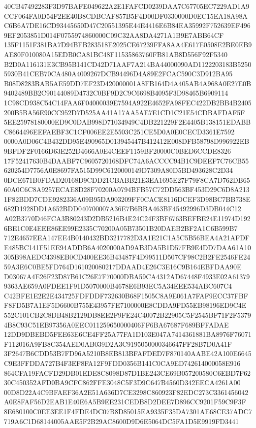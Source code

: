 \documentclass[UTF8,fontset=fandol,zihao=-4,a4paper]{ctexart}
\begin{document}
{{40CB47492283F3D97BAFE049622A2E1FAFCD0239DAA7C67705EC7229AD1A9CCF064FA0D54F2EE40B8CDBCAF857B5F4D00DF0330000D0EC15EA18A98A
C6B6A7DE16CD93445650D47C20551395E44E4416E6B84EA35992F752639EF4969EF2053851D014F0755974860000C09C32AA8DA4271A1B9E7ABB64CF
135F1151F381BA7D94BFB283518E2025CE67239FFA8AA4E617E0508E2BE0EB9AE80F010080A15EDB0CA81BC48F11535863760FB81AB8D556F92F5340
B2D0A116131E3CB95B141CD42D71AAF7A214BA44000090AD1122203183B52505930B41CEB70CA480A4009267DCB94496D4A89E2FCAC590C3D912BA95
B08D8283BAB5AE59DD7EF23D420000001A8FB164D4A405AB4A968A0E27E0B9402489BB2C90144089D4732C0BF9D2C9C6698B4095F3D98465B6909114
1C98CD938C54C14FAA6F04000039E7594A922E4652FA98FEC422DB2BB4B2405200B5BA56E90CC952D7D525AA41A17AA5AE7E1CD1C21E54CDBAFDAF5F
5EE25978180000ED9C0DAB998D71034949C4DB221229F2E4405B138151EDABBC8664496EEFAEBF3C1CF006EE2E5503C251CE5D0A0E0CECD3361E7592
0000A0D06C4B432DD95E490965D013945447B412412E008DFB58798D996922EB9BFDF2F0166D63E252D4666A0E4CEEF1159BF20000C0BED6CCDE8326
17F52417630B4DAABF7C9605720168DFC74A6ACCCC94B1C9DEEF7C76CB55620254D7756A0E8697FA515D99C6120000149D7309A80D5BD493628C2D34
0DCE671B0FDAD20168D9CDD21CBABB21E3EA1695E27F79F8CA7D762DB6560A0C6C8A9257ECAE8D28F70200A0794BFB57C72DD563BF453D29C6D8A213
1F82BDD7CDE9282336A09B95DA903209FF0CACE8116DCEF3D98BC7BB738E682D1928DD1A652BDD040700007A36E7B6BBA463BF45492996D3DB044C12
A02B3770D46FCA3B80243D2DB5216B4E24C24F3BF6763BEFBE24E11974D1926BE1C0E4EEE86EE99E2335C70200A05B73501B20DAEB2BF2A1C6B599B7
712E4657EEA147EE4B0140432BD3217782D3A1E21C1A5C5B56BEA4A21AFDFE485BC141F51EE94ADDB6A4020000AD9AB3DA5B1D57FB9E4DD7DAA61A10
305B98AEDC4398EB0CD400EE36B43487F4D99511D507CF98C2B2FE2546FE2459A3E6C0BE5FD764D161020080217DDAAD4E26C3E16C9B164EBFDAA90E
D03067A4E26F23D87B61C26E7F70000DBA59CA4312AD67448F4933E02A613799363AE659A0FDEE1F91D5070000B4678E6B93EC5A34EEE534ABC607C4
C42BFE1E2E2E434725FDFDDF732630B68F1505C8A9E061A7FAF9ECC37FBFF8FD5B7A1EF5D6600B755E43957FE7100000E8CDDA9FD55EB98196ED9C4E
552C101CB2C8DB48B2129DB8EE2F9FE24C40072B22905C5F2545BF71F2F53794B8C93C51EB97356A0EEC011259650000406FF6BA67687F689BFFADAE
12DD9DBEBD5FEE63E6CE4FF25A77FA1D103E047A7414361881BA8976F76071F112016A9FB8C354AED0AB039D2A3C9195050000346647FF28B7D0A41F
3F2647B6CDD53B7FD96A5210B8EB813BFAFDED7F870140AABE42A100E6645C9E3FFDDA727B4F3EF8FA12F9FDD0356B141C0CA9ED742614000058E916
864CFA19FACFD29DB01EDE8C8098D87D1BE243CE69B057200580C6EBD7F6230C450352AFD0BA9CFC862FFE3048C5F3D9C647B4560D342EECA4261A00
00D8D22A4C9BFAEF36A2E51A636D7CE3298C860923F82EDC273C3361456042A0E8FAF56D2EAB1E40E6A5B9EE231CEDB8D2DEE7D896CC9201F59C9F3F
8E680100C0EE3EE1F4FDE4DC07B8D85015EA9335F35DA7301AE68CE37ADC7719A6C1D68144005AAE5F2B29AC8600D9D6E5064DC5FA1D5E9919FD3441
}}
\end{document}
